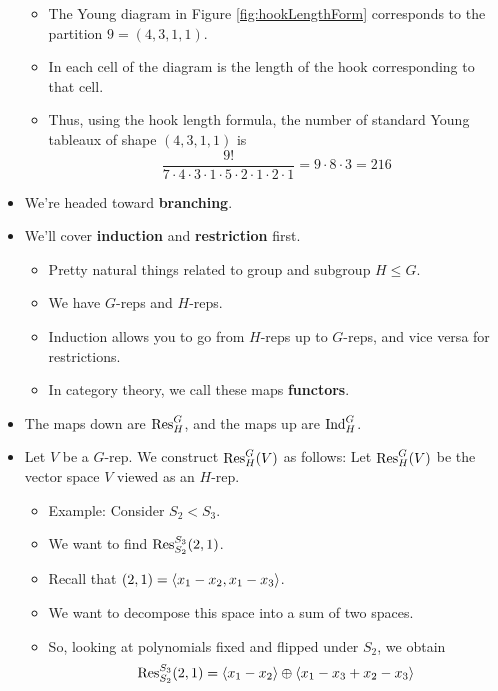 \documentclass[../notes.tex]{subfiles}
\begin{document}
\begin{itemize}
    \begin{itemize}
        \item The Young diagram in Figure \ref{fig:hookLengthForm} corresponds to the partition $9=(4,3,1,1)$.
        \item In each cell of the diagram is the length of the hook corresponding to that cell.
        \item Thus, using the hook length formula, the number of standard Young tableaux of shape $(4,3,1,1)$ is
        \begin{equation*}
            \frac{9!}{7\cdot 4\cdot 3\cdot 1\cdot 5\cdot 2\cdot 1\cdot 2\cdot 1} = 9\cdot 8\cdot 3
            = 216
        \end{equation*}
    \end{itemize}
    \item We're headed toward \textbf{branching}.
    \item We'll cover \textbf{induction} and \textbf{restriction} first.
    \begin{itemize}
        \item Pretty natural things related to group and subgroup $H\leq G$.
        \item We have $G$-reps and $H$-reps.
        \item Induction allows you to go from $H$-reps up to $G$-reps, and vice versa for restrictions.
        \item In category theory, we call these maps \textbf{functors}.
    \end{itemize}
    \item The maps down are $\operatorname{Res}_H^G$, and the maps up are $\operatorname{Ind}_H^G$.
    \item Let $V$ be a $G$-rep. We construct $\operatorname{Res}_H^G(V)$ as follows: Let $\operatorname{Res}_H^G(V)$ be the vector space $V$ viewed as an $H$-rep.
    \begin{itemize}
        \item Example: Consider $S_2<S_3$.
        \item We want to find $\operatorname{Res}_{S_2}^{S_3}(2,1)$.
        \item Recall that $(2,1)=\left\langle{x_1-x_2,x_1-x_3}\right\rangle$.
        \item We want to decompose this space into a sum of two spaces.
        \item So, looking at polynomials fixed and flipped under $S_2$, we obtain
        \begin{equation*}
            \operatorname{Res}_{S_2}^{S_3}(2,1) = \left\langle{x_1-x_2}\right\rangle\oplus\left\langle{x_1-x_3+x_2-x_3}\right\rangle
        \end{equation*}

\end{itemize}
\end{itemize}
\end{document}
